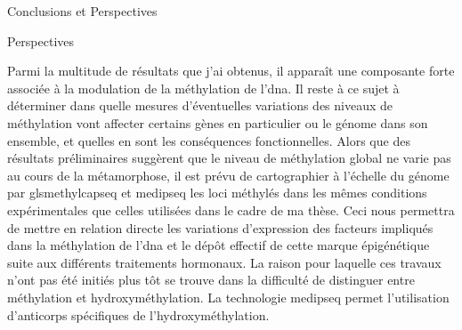 \documentclass[../main.tex]{subfiles}
\begin{document}
\begin{chapter}{Conclusions et Perspectives}
\begin{section}{Perspectives}


Parmi la multitude de résultats que j'ai obtenus, il apparaît une composante forte associée à la modulation de la méthylation de l'\gls{dna}.
Il reste à ce sujet à déterminer dans quelle mesures d'éventuelles variations des niveaux de méthylation vont affecter certains gènes en particulier ou le génome dans son ensemble, et quelles en sont les conséquences fonctionnelles.
Alors que des résultats préliminaires suggèrent que le niveau de méthylation global ne varie pas au cours de la métamorphose, il est prévu de cartographier à l'échelle du génome par gls{methylcapseq} et \gls{medipseq} les loci méthylés dans les mêmes conditions expérimentales que celles utilisées dans le cadre de ma thèse.
Ceci nous permettra de mettre en relation directe les variations d'expression des facteurs impliqués dans la méthylation de l'\gls{dna} et le dépôt effectif de cette marque épigénétique suite aux différents traitements hormonaux.
La raison pour laquelle ces travaux n'ont pas été initiés plus tôt se trouve dans la difficulté de distinguer entre méthylation et hydroxyméthylation.
La technologie \gls{medipseq} permet l'utilisation d'anticorps spécifiques de l'hydroxyméthylation.


\end{section}

\end{chapter}
\end{document}
